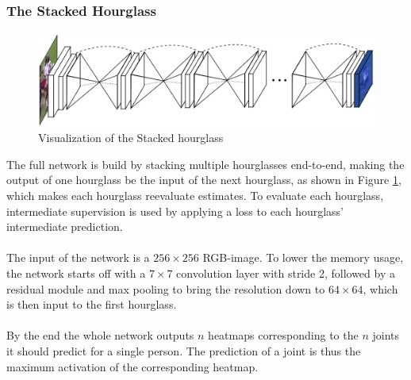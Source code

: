 \documentclass[./main.tex]{subfiles}
\begin{document}
\subsubsection{The Stacked Hourglass}
\begin{figure}[htbp]
    \centering
    \includegraphics[height = 4 cm]{entities/SHG.png}
    \caption{Visualization of the Stacked hourglass \cite{Newell}}
    \label{fig:SHG}
\end{figure}
\noindent The full network is build by stacking multiple hourglasses end-to-end, making the output of one hourglass be the input of the next hourglass, as shown in Figure \ref{fig:SHG}, which makes each hourglass reevaluate estimates. To evaluate each hourglass, intermediate supervision is used by applying a loss to each hourglass' intermediate prediction.
\\
\\
The input of the network is a $256 \times 256$ RGB-image. To lower the memory usage, the network starts off with a $7 \times 7$ convolution layer with stride 2, followed by a residual module and max pooling to bring the resolution down to $64 \times 64$, which is then input to the first hourglass.
\\
\\
By the end the whole network outputs $n$ heatmaps corresponding to the $n$ joints it should predict for a single person. The prediction of a joint is thus the maximum activation of the corresponding heatmap.
\end{document}
